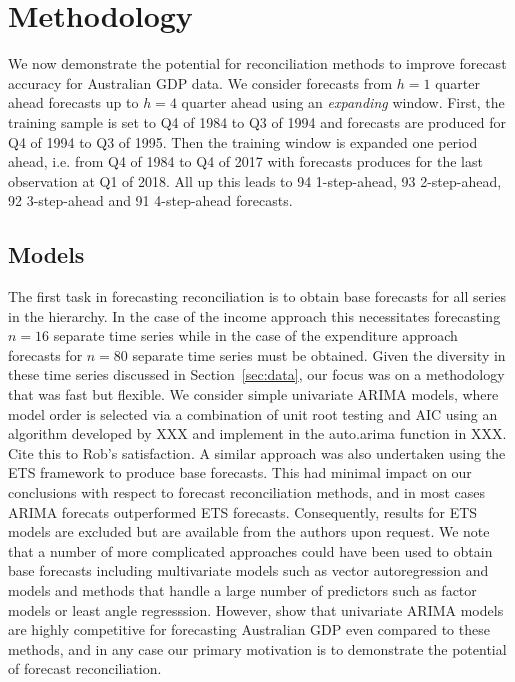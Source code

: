 \documentclass[graybox]{svmult}
\begin{document}
\section{Methodology}\label{sec:meth}

We now demonstrate the potential for reconciliation methods to improve forecast accuracy for Australian GDP data.  We consider forecasts from $h=1$ quarter ahead forecasts up to $h=4$ quarter ahead using an {\em expanding} window.  First, the training sample is set to Q4 of 1984 to Q3 of 1994 and forecasts are produced for Q4 of 1994 to Q3 of 1995. Then the training window is expanded one period ahead, i.e. from Q4 of 1984 to Q4 of 2017 with forecasts produces for the last observation at Q1 of 2018. All up this leads to 94 1-step-ahead, 93 2-step-ahead, 92 3-step-ahead and 91 4-step-ahead forecasts.


\subsection{Models}


The first task in forecasting reconciliation is to obtain base forecasts for all series in the hierarchy.  In the case of the income approach this necessitates forecasting $n=16$ separate time series while in the case of the expenditure approach forecasts for $n=80$ separate time series must be obtained.  Given the diversity in these time series discussed in Section~\ref{sec:data}, our focus was on a methodology that was fast but flexible.  We consider simple univariate ARIMA models, where model order is selected via a combination of unit root testing and AIC using an algorithm developed by XXX and implement in the auto.arima function in XXX. {\color{red} Cite this to Rob's satisfaction}.  A similar approach was also undertaken using the ETS framework to produce base forecasts.  This had minimal impact on our conclusions with respect to forecast reconciliation methods, and in most cases ARIMA forecats outperformed ETS forecasts.  {\color{orange} Consequently, results for ETS models are excluded but are available from the authors upon request}.  We note that a number of more complicated approaches could have been used to obtain base forecasts including multivariate models such as vector autoregression and models and methods that handle a large number of predictors such as factor models or least angle regresssion.  However, \cite{PanEtAl2019} show that univariate ARIMA models are highly competitive for forecasting Australian GDP even compared to these methods, and in any case our primary motivation is to demonstrate the potential of forecast reconciliation.
\end{document}
